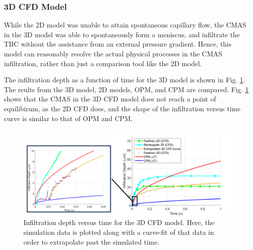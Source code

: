 \documentclass{UCF_ETD}
\begin{document}

\subsubsection{3D CFD Model}

While the 2D model was unable to attain spontaneous capillary flow, the CMAS in the 3D model was able to spontaneously form a meniscus, and infiltrate the TBC without the assistance from an external pressure gradient. Hence, this model can reasonably resolve the actual physical processes in the CMAS infiltration, rather than just a comparison tool like the 2D model. 

The infiltration depth as a function of time for the 3D model is shown in Fig. \ref{fig:3D_results}. The reults from the 3D model, 2D models, OPM, and CPM are compared. Fig. \ref{fig:3D_results} shows that the CMAS in the 3D CFD model does not reach a point of equilibirum, as the 2D CFD does, and the shape of the infiltration versus time curve is similar to that of OPM and CPM. 

\begin{figure}
    \centering
    \includegraphics[width=\linewidth]{Figures/3D_results.png}
    \caption{Infiltration depth versus time for the 3D CFD model. Here, the simulation data is plotted along with a curve-fit of that data in order to extrapolate past the simulated time.}
    \label{fig:3D_results}
\end{figure}
\end{document}
